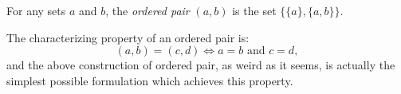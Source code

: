 \documentclass[12pt]{article}
\begin{document}
For any sets $a$ and $b$, the {\em ordered pair} $(a,b)$ is the set $\{\{a\}, \{a,b\}\}$.

The characterizing property of an ordered pair is:
$$
(a,b) = (c,d) \iff a=b \text{\ \ and\ \ } c=d,
$$
and the above construction of ordered pair, as weird as it seems, is actually the simplest possible formulation which achieves this property.
\end{document}
